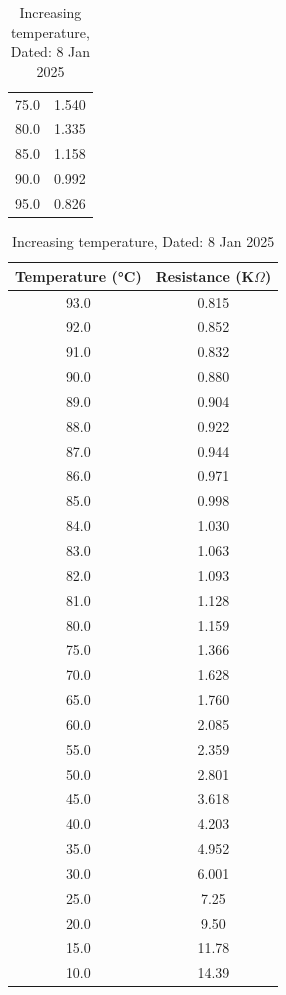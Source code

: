 \documentclass[%
 sor,
 jor,
 amsmath,amssymb,
 reprint,%
]{revtex4-2}
\begin{document}
\begin{table}[ht]
\begin{minipage}{0.48\textwidth}
\begin{tabular}{|c|c|}
        75.0 & 1.540 \\ 
        80.0 & 1.335 \\ 
        85.0 & 1.158 \\ 
        90.0 & 0.992 \\ 
        95.0 & 0.826 \\ 
        \hline
    \end{tabular}
    \caption{Increasing temperature, Dated: 8 Jan 2025 }
    \label{tab:my_label}
\end{minipage}
\begin{minipage}{0.48\textwidth}
    \centering
    \begin{tabular}{|c|c|}
        \hline
        Temperature (\si{\celsius}) & Resistance (K$\Omega$) \\ 
        \hline
        93.0 & 0.815 \\ 
        92.0 & 0.852 \\ 
        91.0 & 0.832 \\ 
        90.0 & 0.880 \\ 
        89.0 & 0.904 \\ 
        88.0 & 0.922 \\ 
        87.0 & 0.944 \\ 
        86.0 & 0.971 \\ 
        85.0 & 0.998 \\ 
        84.0 & 1.030 \\ 
        83.0 & 1.063 \\ 
        82.0 & 1.093 \\ 
        81.0 & 1.128 \\ 
        80.0 & 1.159 \\ 
        75.0 & 1.366 \\ 
        70.0 & 1.628 \\ 
        65.0 & 1.760 \\ 
        60.0 & 2.085 \\ 
        55.0 & 2.359 \\ 
        50.0 & 2.801 \\ 
        45.0 & 3.618 \\ 
        40.0 & 4.203 \\ 
        35.0 & 4.952 \\ 
        30.0 & 6.001 \\ 
        25.0 & 7.25 \\ 
        20.0 & 9.50 \\ 
        15.0 & 11.78 \\ 
        10.0 & 14.39 \\ 

\end{tabular}
\end{minipage}
\end{table}
\end{document}
